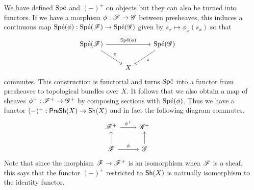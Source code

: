 \documentclass{memoir}
\begin{document}
We have defined $\text{Sp\'e}$ and $(-)^+$ on objects but they can also be turned into functors.
If we have a morphism $\phi:\mathscr{F}\to\mathscr{G}$ between presheaves, this induces a continuous map $\text{Sp\'e}(\phi):\text{Sp\'e}(\mathscr{F})\to \text{Sp\'e}(\mathscr{G})$ given by $s_x\mapsto\phi_x(s_x)$ so that 
\begin{equation}
    \begin{tikzcd}
        \Spe(\shf{F}) \arrow[rr, "\Spe(\phi)"] \arrow[rd,"\pi"] & & \Spe(\shf{G}) \arrow[dl,"\pi"] \\
                                              & X &
    \end{tikzcd}
\end{equation}
commutes.
This construction is functorial and turns $\text{Sp\'e}$ into a functor from presheaves to topological bundles over $X$.
It follows that we also obtain a map of sheaves $\phi^+:\mathscr{F}^+\to\mathscr{G}^+$ by composing sections with $\text{Sp\'e}(\phi)$.
Thus we have a functor $(-)^+:{\normalfont\mathsf{PreSh}}(X)\to{\normalfont\mathsf{Sh}}(X)$ and in fact the following diagram commutes.
\begin{equation}
    \label{eq:sheafif}
    \begin{tikzcd}
        \shf{F}^+ \arrow[r,"\phi^+"] & \shf{G}^+ \\
        \shf{F} \arrow[u] \arrow[r,"\phi"] & \shf{G} \arrow[u]
    \end{tikzcd}
\end{equation}
Note that since the morphism $\mathscr{F}\to\mathscr{F}^+$ is an isomorphism when $\mathscr{F}$ is a sheaf, this says that the functor $(-)^+$ restricted to ${\normalfont\mathsf{Sh}}(X)$ is natrually isomorphism to the identity functor.
\end{document}
